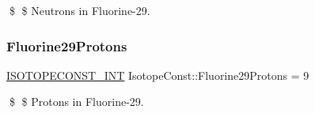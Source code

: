 \$ \$ Neutrons in Fluorine-\/29. \mbox{\label{group___isotope_const-_fluorine-_f29_ga0be1a9e6ca769c463c140b2ce1aa0b9f}} 
\subsubsection{\texorpdfstring{Fluorine29\+Protons}{Fluorine29Protons}}
{\footnotesize\ttfamily \mbox{\hyperlink{group___isotope_const-_macros_ga5f18360b3e99483a35c32d789e62621c}{I\+S\+O\+T\+O\+P\+E\+C\+O\+N\+S\+T\+\_\+\+I\+NT}} Isotope\+Const\+::\+Fluorine29\+Protons = 9}

\$ \$ Protons in Fluorine-\/29. 
